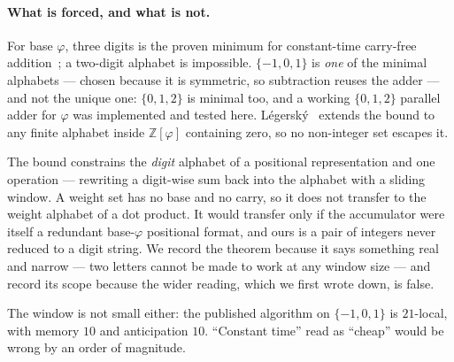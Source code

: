 \documentclass[11pt]{article}
\theoremstyle{definition}
\begin{document}
\paragraph{What is forced, and what is not.} For base $\varphi$, three digits is
the proven minimum for constant-time carry-free addition~\cite{frougny2011,
frougny2013}; a two-digit alphabet is impossible. $\{-1,0,1\}$ is \emph{one} of
the minimal alphabets --- chosen because it is symmetric, so subtraction reuses
the adder --- and not the unique one: $\{0,1,2\}$ is minimal too, and a working
$\{0,1,2\}$ parallel adder for $\varphi$ was implemented and tested here.
L\'egersk\'y~\cite{legersky2018} extends the bound to any finite alphabet inside
$\mathbb{Z}[\varphi]$ containing zero, so no non-integer set escapes it.

The bound constrains the \emph{digit} alphabet of a positional representation
and one operation --- rewriting a digit-wise sum back into the alphabet with a
sliding window. A weight set has no base and no carry, so it does not transfer
to the weight alphabet of a dot product. It would transfer only if the
accumulator were itself a redundant base-$\varphi$ positional format, and ours
is a pair of integers never reduced to a digit string. We record the theorem
because it says something real and narrow --- two letters cannot be made to work
at any window size --- and record its scope because the wider reading, which we
first wrote down, is false.

The window is not small either: the published algorithm on $\{-1,0,1\}$ is
$21$-local, with memory $10$ and anticipation $10$. ``Constant time'' read as
``cheap'' would be wrong by an order of magnitude.
\end{document}
